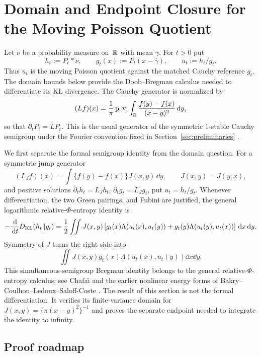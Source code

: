 \section{Domain and Endpoint Closure for the Moving Poisson Quotient}%
\label{sec:doob-phi-entropy}

Let \(\nu\) be a probability measure on~\(\mathbb{R}\) with mean \(\bar{\gamma}\).
For \(t>0\) put
\[
h_t:=P_t*\nu,\qquad
g_t(x):=P_t(x-\bar{\gamma}),\qquad
u_t:=h_t/g_t .
\]
Thus \(u_t\) is the moving Poisson quotient against the matched Cauchy
reference \(g_t\).  The domain bounds below provide the Doob--Bregman
calculus needed to differentiate its KL divergence.
The Cauchy generator is normalized by
\[
(Lf)(x)=\frac1\pi\operatorname{p.v.}\int_{\mathbb{R}}
\frac{f(y)-f(x)}{(x-y)^2}\,\mathrm{d} y,
\]
so that \(\partial_tP_t=LP_t\).  This is the usual generator of the symmetric
\(1\)-stable Cauchy semigroup under the Fourier convention fixed in
Section~\ref{sec:preliminaries}
\cite{Feller1971,Bertoin1996LevyProcesses,Sato1999LevyProcesses,
Applebaum2009LevyProcesses,Kwasnicki2017}.

We first separate the formal semigroup identity from the domain question.
For a symmetric jump generator
\[
(L_Jf)(x)=\int\{f(y)-f(x)\}J(x,y)\,\dd y,
\qquad J(x,y)=J(y,x),
\]
and positive solutions \(\partial_t h_t=L_Jh_t\),
\(\partial_t g_t=L_Jg_t\), put \(u_t=h_t/g_t\).  Whenever differentiation,
the two Green pairings, and Fubini are justified, the general logarithmic
relative-\(\Phi\)-entropy identity is
\begin{equation}\label{eq:section4-general-two-solution-jump-identity}
-\frac{\,\mathrm{d}}{\,\mathrm{d} t}D_{\rm KL}(h_t\|g_t)
=\frac12\iint J(x,y)
\left[g_t(x)\Lambda(u_t(x),u_t(y))
+g_t(y)\Lambda(u_t(y),u_t(x))\right]\,\mathrm{d} x\,\mathrm{d} y.
\end{equation}
Symmetry of \(J\) turns the right side into
\[
\iint J(x,y)g_t(x)\Lambda(u_t(x),u_t(y))\dd x\dd y.
\]
This simultaneous-semigroup Bregman identity belongs to the general
relative-\(\Phi\)-entropy calculus; see Chafa{\"\i}
\cite{Chafai2004PhiEntropies} and the earlier nonlinear energy forms of
Bakry--Coulhon--Ledoux--Saloff-Coste
\cite{BakryCoulhonLedouxSaloffCoste1995}.  The result of this section is not
the formal differentiation.  It verifies its finite-variance domain for
\(J(x,y)=\{\pi(x-y)^2\}^{-1}\) and proves the separate endpoint needed to
integrate the identity to infinity.

\subsection*{Proof roadmap}

